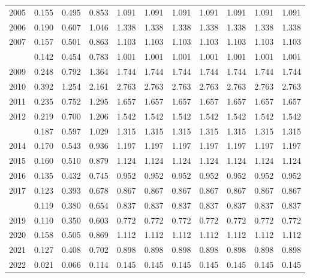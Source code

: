 \documentclass[
]{article}
\begin{document}
\begin{longtable}[t]{lrrrrrrrrrr}
2005 & 0.155 & 0.495 & 0.853 & 1.091 & 1.091 & 1.091 & 1.091 & 1.091 & 1.091 & 1.091\\
2006 & 0.190 & 0.607 & 1.046 & 1.338 & 1.338 & 1.338 & 1.338 & 1.338 & 1.338 & 1.338\\
2007 & 0.157 & 0.501 & 0.863 & 1.103 & 1.103 & 1.103 & 1.103 & 1.103 & 1.103 & 1.103\\
\addlinespace
2008 & 0.142 & 0.454 & 0.783 & 1.001 & 1.001 & 1.001 & 1.001 & 1.001 & 1.001 & 1.001\\
2009 & 0.248 & 0.792 & 1.364 & 1.744 & 1.744 & 1.744 & 1.744 & 1.744 & 1.744 & 1.744\\
2010 & 0.392 & 1.254 & 2.161 & 2.763 & 2.763 & 2.763 & 2.763 & 2.763 & 2.763 & 2.763\\
2011 & 0.235 & 0.752 & 1.295 & 1.657 & 1.657 & 1.657 & 1.657 & 1.657 & 1.657 & 1.657\\
2012 & 0.219 & 0.700 & 1.206 & 1.542 & 1.542 & 1.542 & 1.542 & 1.542 & 1.542 & 1.542\\
\addlinespace
2013 & 0.187 & 0.597 & 1.029 & 1.315 & 1.315 & 1.315 & 1.315 & 1.315 & 1.315 & 1.315\\
2014 & 0.170 & 0.543 & 0.936 & 1.197 & 1.197 & 1.197 & 1.197 & 1.197 & 1.197 & 1.197\\
2015 & 0.160 & 0.510 & 0.879 & 1.124 & 1.124 & 1.124 & 1.124 & 1.124 & 1.124 & 1.124\\
2016 & 0.135 & 0.432 & 0.745 & 0.952 & 0.952 & 0.952 & 0.952 & 0.952 & 0.952 & 0.952\\
2017 & 0.123 & 0.393 & 0.678 & 0.867 & 0.867 & 0.867 & 0.867 & 0.867 & 0.867 & 0.867\\
\addlinespace
2018 & 0.119 & 0.380 & 0.654 & 0.837 & 0.837 & 0.837 & 0.837 & 0.837 & 0.837 & 0.837\\
2019 & 0.110 & 0.350 & 0.603 & 0.772 & 0.772 & 0.772 & 0.772 & 0.772 & 0.772 & 0.772\\
2020 & 0.158 & 0.505 & 0.869 & 1.112 & 1.112 & 1.112 & 1.112 & 1.112 & 1.112 & 1.112\\
2021 & 0.127 & 0.408 & 0.702 & 0.898 & 0.898 & 0.898 & 0.898 & 0.898 & 0.898 & 0.898\\
2022 & 0.021 & 0.066 & 0.114 & 0.145 & 0.145 & 0.145 & 0.145 & 0.145 & 0.145 & 0.145\\*
\end{longtable}
\end{document}
